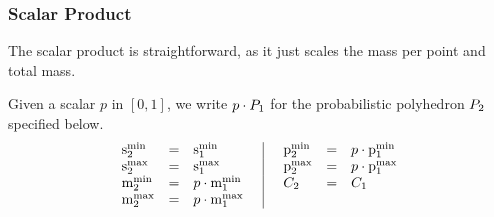 





\subsubsection{Scalar Product}
The scalar product is straightforward, as it just scales the mass per point and total mass.

\begin{definition}
Given a scalar $p$ in $[0,1]$, we write $p \cdot P_{1}$ for the probabilistic polyhedron $P_{2}$ specified below.
\[
\begin{array}{lcl@{\hspace{0.5cm}}|@{\hspace{0.5cm}}lcl}
\smin{2} &=& \smin{1} & \pmin{2} &=& p \cdot \pmin{1} \\
\smax{2} &=& \smax{1} & \pmax{2} &=& p \cdot \pmax{1} \\
\mmin{2} &=& p \cdot \mmin{1} & \getpoly{2} &=& \getpoly{1}\\
\mmax{2} &=& p \cdot \mmax{1} 
\end{array}
\]
\end{definition}

